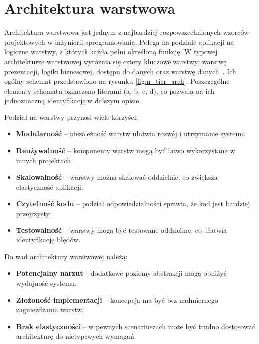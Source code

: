 \section{Architektura warstwowa}

Architektura warstwowa jest jednym z najbardziej rozpowszechnionych wzorców projektowych w inżynierii oprogramowania. Polega na podziale aplikacji na logiczne warstwy, z których każda pełni określoną funkcję. W typowej architekturze warstwowej wyróżnia się cztery kluczowe warstwy: warstwę prezentacji, logiki biznesowej, dostępu do danych oraz warstwę danych~\cite{n_tier_baeldung, n_tier_medium}. Ich ogólny schemat przedstawiono na rysunku \ref{fig:n_tier_arch}. Poszczególne elementy schematu oznaczono literami (a, b, c, d), co pozwala na ich jednoznaczną identyfikację w dalszym opisie.

\noindent Podział na warstwy przynosi wiele korzyści:
\begin{itemize}
    \item \textbf{Modularność} -- niezależność warstw ułatwia rozwój i utrzymanie systemu.
    \item \textbf{Reużywalność} -- komponenty warstw mogą być łatwo wykorzystane w innych projektach.
    \item \textbf{Skalowalność} -- warstwy można skalować oddzielnie, co zwiększa elastyczność aplikacji.
    \item \textbf{Czytelność kodu} -- podział odpowiedzialności sprawia, że kod jest bardziej przejrzysty.
    \item \textbf{Testowalność} -- warstwy mogą być testowane oddzielnie, co ułatwia identyfikację błędów.
\end{itemize}
Do wad architektury warstwowej należą:
\begin{itemize}
    \item \textbf{Potencjalny narzut} -- dodatkowe poziomy abstrakcji mogą obniżyć wydajność systemu.
    \item \textbf{Złożoność implementacji} -- koncepcja ma być bez nadmiernego zagnieżdżania warstw.
    \item \textbf{Brak elastyczności} -- w pewnych scenariuszach może być trudno dostosować architekturę do nietypowych wymagań.
\end{itemize}

